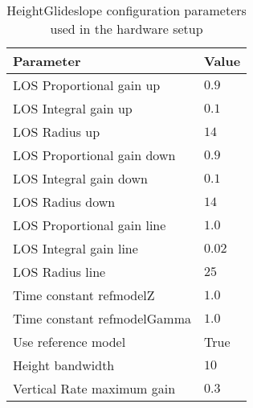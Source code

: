 \begin{table}[H]
\centering
\begin{tabular}{| l | l |}
\hline
\textbf{Parameter}	&	\textbf{Value} \\ \hline
LOS Proportional gain up        &        $0.9$ \\ \hline
LOS Integral gain up            &        $0.1$ \\ \hline
LOS Radius up                   &        $14$ \\ \hline
LOS Proportional gain down       &       $0.9$ \\ \hline
LOS Integral gain down          &        $0.1$ \\ \hline
LOS Radius down                  &       $14$ \\ \hline
LOS Proportional gain line      &        $1.0$ \\ \hline
LOS Integral gain line          &        $0.02$ \\ \hline
LOS Radius line                &         $25$ \\ \hline
Time constant refmodelZ         &        $1.0$ \\ \hline
Time constant refmodelGamma     &        $1.0$ \\ \hline
Use reference model             &        True \\ \hline
Height bandwidth               &        $10$ \\ \hline
Vertical Rate maximum gain      &        $0.3$ \\ \hline
\end{tabular}
\caption{HeightGlideslope configuration parameters used in the hardware setup}
\label{AP:TB:HeightGlideslope}
\end{table}